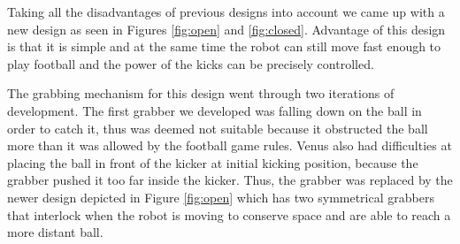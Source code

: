 \documentclass[a4paper,12pt]{article}
\begin{document}
Taking all the disadvantages of previous designs into account we came up with a new design as seen in Figures \ref{fig:open} and \ref{fig:closed}. Advantage of this design is that it is simple and at the same time the robot can still move fast enough to play football and the power of the kicks can be precisely controlled. 

The grabbing mechanism for this design went through two iterations of development.
The first grabber we developed was falling down on the ball in order to catch it, thus was deemed not suitable because it obstructed the ball more than it was allowed by the football game rules. Venus also had difficulties at placing the ball in front of the kicker at initial kicking position, because the grabber pushed it
too far inside the kicker. Thus, the grabber was replaced by the newer design depicted in Figure \ref{fig:open} which has two symmetrical grabbers that interlock when the robot is moving to conserve space and are able to reach a more distant ball.
\end{document}
